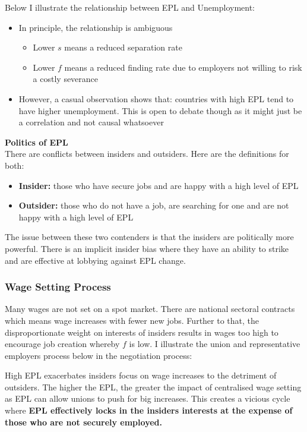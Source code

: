 \documentclass[12pt, letterpaper]{article}
\begin{document}
Below I illustrate the relationship between EPL and Unemployment:
\begin{itemize}
	\item In principle, the relationship is ambiguous
		\begin{itemize}
			\item Lower $s$ means a reduced separation rate
			\item Lower $f$ means a reduced finding rate due to employers not willing to risk a costly severance
		\end{itemize}
	\item However, a casual observation shows that: countries with high EPL tend to have higher unemployment. This is open to debate though as it might just be a correlation and not causal whatsoever
\end{itemize}
\textbf{Politics of EPL}\\
There are conflicts between insiders and outsiders. Here are the definitions for both:
\begin{itemize}
	\item \textbf{Insider:} those who have secure jobs and are happy with a high level of EPL
	\item \textbf{Outsider:} those who do not have a job, are searching for one and are not happy with a high level of EPL
\end{itemize}
The issue between these two contenders is that the insiders are politically more powerful. There is an implicit insider bias where they have an ability to strike and are effective at lobbying against EPL change.

\subsubsection{Wage Setting Process}
Many wages are not set on a spot market. There are national sectoral contracts which means wage increases with fewer new jobs. Further to that, the disproportionate weight on interests of insiders results in wages too high to encourage job creation whereby $f$ is low. I illustrate the union and representative employers process below in the negotiation process:
\begin{center}
\noindent{}
\end{center}
High EPL exacerbates insiders focus on wage increases to the detriment of outsiders. The higher the EPL, the greater the impact of centralised wage setting as EPL can allow unions to push for big increases. This creates a vicious cycle where \textbf{EPL effectively locks in the insiders interests at the expense of those who are not securely employed.}
\end{document}

